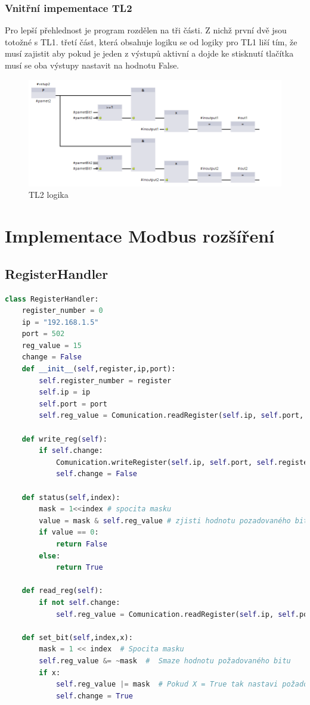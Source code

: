 \documentclass[a4paper,12pt,czech,bibliography=totoc]{scrbook}
\begin{document}
\subsubsection{Vnitřní impementace TL2}
Pro lepší přehlednost je program rozdělen na tři části. Z nichž první dvě jsou totožné s TL1.  třetí část, která obsahuje logiku se od logiky pro TL1 liší tím, že musí zajistit aby pokud je jeden z výstupů aktivní a dojde ke stisknutí tlačítka musí se oba výstupy nastavit na hodnotu False.
\begin{figure}[h]
	\centering
	\includegraphics[scale = 0.6]{TL2_s3.PNG}
	\caption{TL2 logika}
	\label{fig:my_label}
\end{figure}
\section{Implementace Modbus rozšíření}
\subsection{RegisterHandler}
\begin{lstlisting}[language=Python]
class RegisterHandler:
	register_number = 0
	ip = "192.168.1.5"
	port = 502
	reg_value = 15
	change = False
	def __init__(self,register,ip,port):
		self.register_number = register
		self.ip = ip
		self.port = port
		self.reg_value = Comunication.readRegister(self.ip, self.port, self.register_number)

	def write_reg(self):
		if self.change:
			Comunication.writeRegister(self.ip, self.port, self.register_number, self.reg_value)
			self.change = False

	def status(self,index):
		mask = 1<<index # spocita masku
		value = mask & self.reg_value # zjisti hodnotu pozadovaného bitu
		if value == 0:
			return False
		else:
			return True

	def read_reg(self):
		if not self.change:
			self.reg_value = Comunication.readRegister(self.ip, self.port, self.register_number)

	def set_bit(self,index,x):
		mask = 1 << index  # Spocita masku
		self.reg_value &= ~mask  #  Smaze hodnotu požadovaného bitu
		if x:
			self.reg_value |= mask  # Pokud X = True tak nastavi požadovaný bit na 1
			self.change = True
\end{lstlisting}
\end{document}
